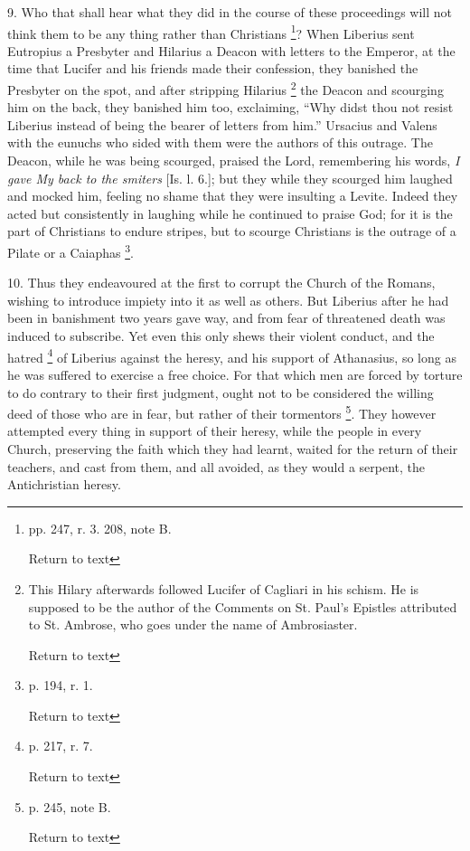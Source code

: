 9. Who that shall hear what they did in the
course of these proceedings will not think them to be any thing rather
than Christians \footnote{pp. 247, r. 3. 208, note B.

Return to text}? When Liberius sent
Eutropius a Presbyter and Hilarius a Deacon with letters to the
Emperor, at the time that Lucifer and his friends made their
confession, they banished the Presbyter on the spot, and after
stripping Hilarius \footnote{This Hilary afterwards followed Lucifer of Cagliari in his schism. He
is supposed to be the author of the Comments on St. Paul's Epistles
attributed to St. Ambrose, who goes under the name of Ambrosiaster.

Return to text

} the Deacon and
scourging him on the back, they banished him too, exclaiming, ``Why
didst thou not resist Liberius instead of being the bearer of letters
from him.'' Ursacius and Valens with the eunuchs who sided with them
were the authors of this outrage. The Deacon, while he was being
scourged, praised the Lord, remembering his words, \emph{I gave My back
to the smiters} [Is. l. 6.]; but they while they scourged him
laughed and mocked him, feeling no shame that they were insulting a
Levite. Indeed they acted but consistently in laughing while he
continued to praise God; for it is the part of Christians to endure
stripes, but to scourge Christians is the outrage of a Pilate or a
Caiaphas \footnote{p. 194, r. 1.

Return to text}.

10. Thus they endeavoured at the first to corrupt
the Church of the Romans, wishing to introduce impiety into it as well
as others. But Liberius after he had been in banishment two years gave
way, and from fear of threatened death was induced to subscribe. Yet
even this only shews their violent conduct, and the hatred \footnote{p. 217, r. 7.

Return to text} of Liberius against the heresy, and his support of Athanasius, so
long as he was suffered to exercise a free choice. For that which men
are forced by torture to do contrary to their first judgment, ought
not to be considered the willing deed of those who are in fear, but
rather of their tormentors \footnote{p. 245, note B.

Return to text}. They
however attempted every thing in support of their heresy, while the
people in every Church, preserving the faith which they had learnt,
waited for the return of their teachers, and cast from them, and all
avoided, as they would a serpent, the Antichristian heresy.

